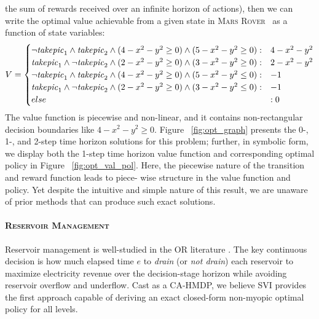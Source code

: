 \documentclass[twoside,11pt]{article}
\newcommand{\MarsRover}{\textsc{Mars Rover }}
\newcommand{\WaterReservoir}{\textsc{Reservoir Management }}
\begin{document}
the sum of rewards received over an infinite horizon of actions), then
we can write the optimal value achievable from a given state in \MarsRover\ 
as a function of state variables:
{%
\begin{align*}
V = \begin{cases}
\neg \mathit{take\-pic}_1 \land \mathit{take\-pic}_2 \land (4 -x^2 -y^2\geq 0) \land 
(5 - x^2 - y^2\geq 0) : & 4 -x^2 -y^2 \\
\mathit{take\-pic}_1 \land \neg \mathit{take\-pic}_2 \land (2 -x^2 -y^2\geq 0) \land 
(3 - x^2 - y^2\geq 0) : & 2 -x^2 -y^2 \\
\neg \mathit{take\-pic}_1 \land \mathit{take\-pic}_2 \land (4 -x^2 -y^2\geq 0) \land 
(5 - x^2 - y^2\leq 0) : & -1 \\
\mathit{take\-pic}_1 \land \neg \mathit{take\-pic}_2 \land (2 -x^2 -y^2\geq 0) \land 
(3 - x^2 - y^2\leq 0) : & -1 \\
else &: 0 \\
\end{cases} 
\end{align*}
}
The value function is piecewise and non-linear, and it contains non-rectangular decision
boundaries like $4 -x^2 -y^2\geq 0$. Figure ~\ref{fig:opt_graph} presents the  0-, 1-, and 2-step time horizon solutions for this problem; further, in symbolic form, we display both the 1-step time horizon value function and corresponding optimal policy in Figure ~\ref{fig:opt_val_pol}. Here, the piecewise nature of the transition and reward function leads to piece- wise structure in the value function and policy. Yet despite the intuitive and simple nature of this result, we are unaware of prior methods that can produce such exact solutions. 

\paragraph{\WaterReservoir} 
Reservoir management is well-studied in
the OR literature \cite{Mahootchi2009,Yeh1985}.  The key continuous decision is how
much elapsed time $e$ to
\emph{drain} (or \emph{not drain}) each reservoir to maximize
electricity revenue over the decision-stage horizon while avoiding
reservoir overflow and underflow.  Cast as a CA-HMDP, we 
believe SVI provides the first approach capable of deriving
an exact closed-form non-myopic optimal policy
for all levels.
\end{document}
